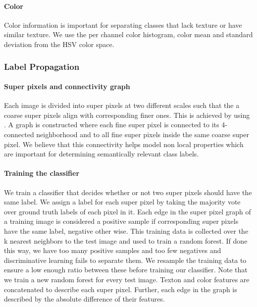 \documentclass{article} %
\begin{document}
\paragraph{Color}
Color information is important for separating classes that lack texture or
have similar texture.
We use the per channel color histogram, color mean and standard deviation
from the HSV color space.
\subsubsection{Label Propagation}
\label{sec:labprop}
\paragraph{Super pixels and connectivity graph}
Each image is divided into super pixels at two different scales such that
the a coarse super pixels align with corresponding finer ones.
This is achieved by using \cite{}.%
A graph is constructed where each fine super pixel is connected to its
4-connected neighborhood and to all fine super pixels inside the same
coarse super pixel.
We believe that this connectivity helps model non local properties which
are important for determining semantically relevant class labels.

\paragraph{Training the classifier}
We train a classifier that decides whether or not two super pixels should
have the same label.
We assign a label for each super pixel by taking the majority vote over
ground truth labels of each pixel in it.
Each edge in the super pixel graph of a training image is considered a
positive sample if corresponding super pixels have the same label,
negative other wise.
This training data is collected over the k nearest neighbors to the test
image and used to train a random forest.
If done this way, we have too many positive samples and too few negatives
and discriminative learning fails to separate them.
We resample the training data to ensure a low enough ratio between these
before training our classifier.
Note that we train a new random forest for every test image.
Texton and color features are concatenated to describe each super pixel.
Further, each edge in the graph is described by the absolute difference of
their features.
\end{document}
